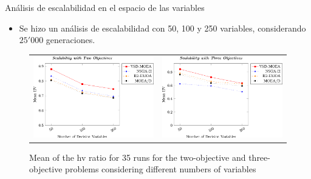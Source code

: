\documentclass{beamer}
\newcommand{\HV}{{\sc hv}}
\begin{document}
\begin{frame}{Análisis de escalabilidad en el espacio de las variables}
\begin{itemize}
\item Se hizo un análisis de escalabilidad con 50, 100 y 250 variables, considerando $25'000$ generaciones.
\end{itemize}
\begin{figure}
\centering
\begin{tabular}{cc}
\includegraphics[scale=0.6]{Images/Graphic-Scalability-2obj_tikz-figure0.eps} & \includegraphics[scale=0.6]{Images/Graphic-Scalability-3obj_tikz-figure0.eps}
\end{tabular}
\caption{Mean of the \HV{} ratio for 35 runs for the two-objective and three-objective problems considering different numbers of variables}
\end{figure}
\end{frame}
\end{document}
